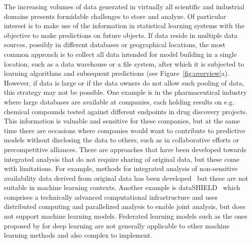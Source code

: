 \documentclass[preprint,12pt,authoryear]{elsarticle}
\begin{document}
The increasing volumes of data generated in virtually all scientific and industrial domains presents formidable challenges to store and analyze. Of particular interest is to make use of the information in statistical learning systems with the objective to make predictions on future objects. If data reside in multiple data sources, possibly in different databases or geographical locations, the most common approach is to collect all data intended for model building in a single location, such as a data warehouse or a file system, after which it is subjected to learning algorithms and subsequent predictions (see Figure~\ref{fig:overview}a). However, if data is large or if the data owners do not allow such pooling of data, this strategy may not be possible. One example is in the pharmaceutical industry where large databases are available at companies, each holding results on e.g. chemical compounds tested against different endpoints in drug discovery projects. This information is valuable and sensitive for these companies, but at the same time there are occasions where companies would want to contribute to predictive models without disclosing the data to others, such as in collaborative efforts or precompetitive alliances. There are approaches that have been developed towards integrated analysis that do not require sharing of original data, but these come with limitations. For example, methods for integrated analysis of non-sensitive availability data derived from original data has been developed~\citep{Spjuth:2016ly} but these are not suitable in machine learning contexts. Another example is dataSHIELD~\citep{Gaye:2014sf} which comprises a technically advanced computational infrastructure and uses distributed computing and parallelized analysis to enable joint analysis, but does not support machine learning models. Federated learning models such as the ones proposed by \cite{Shokri:2015os} for deep learning are not generally applicable to other machine learning methods and also complex to implement.
 
\end{document}
